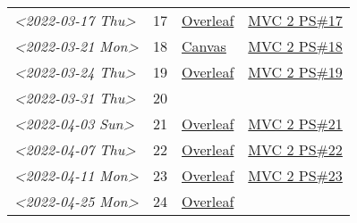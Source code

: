 \documentclass[letterpaper]{article}
\begin{document}
\begin{center}
\begin{tabular}{lrll}
\textit{<2022-03-17 Thu>} & 17 & \href{https://www.overleaf.com/project/6231772f4c6371c98cbaabd1}{Overleaf} & \href{../../../src/mathematics/multi_variable_calculus/KBhmvc_2_ps_17.org}{MVC 2 PS\#17}\\
\textit{<2022-03-21 Mon>} & 18 & \href{https://nuevaschool.instructure.com/courses/4135/assignments/68844}{Canvas} & \href{../../../src/mathematics/multi_variable_calculus/KBhmvc_2_ps_18.org}{MVC 2 PS\#18}\\
\textit{<2022-03-24 Thu>} & 19 & \href{https://www.overleaf.com/project/623890fa572c20eb441fee68}{Overleaf} & \href{../../../src/mathematics/multi_variable_calculus/KBh2_ps_19.org}{MVC 2 PS\#19}\\
\textit{<2022-03-31 Thu>} & 20 &  & \\
\textit{<2022-04-03 Sun>} & 21 & \href{https://www.overleaf.com/project/6249e9f782a57a451c5682c5}{Overleaf} & \href{../../../src/mathematics/multi_variable_calculus/KBhmvc_2_ps_21.org}{MVC 2 PS\#21}\\
\textit{<2022-04-07 Thu>} & 22 & \href{https://www.overleaf.com/project/624dee9cdb42f35fa74609ac}{Overleaf} & \href{../../../src/mathematics/multi_variable_calculus/KBhmvc_2_ps_22.org}{MVC 2 PS\#22}\\
\textit{<2022-04-11 Mon>} & 23 & \href{https://www.overleaf.com/read/bmpwkkpvgkyp}{Overleaf} & \href{../../../src/mathematics/multi_variable_calculus/KBhmvc_2_ps_23.org}{MVC 2 PS\#23}\\
\textit{<2022-04-25 Mon>} & 24 & \href{https://www.overleaf.com/read/bmpwkkpvgkyp}{Overleaf} & \\
\end{tabular}
\end{center}
\end{document}

